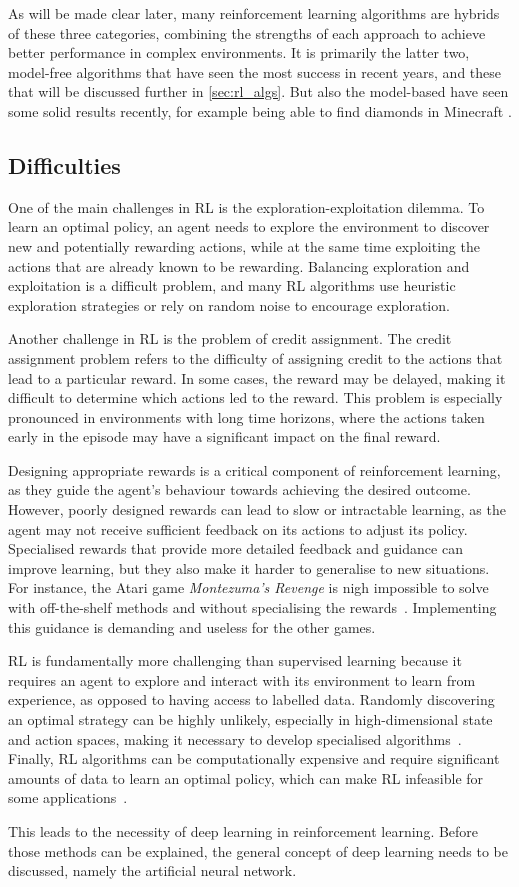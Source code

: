 As will be made clear later, many reinforcement learning algorithms are hybrids of these three categories, combining the strengths of each approach to achieve better performance in complex environments.
It is primarily the latter two, model-free algorithms that have seen the most success in recent years, and these that will be discussed further in \cref{sec:rl_algs}.
But also the model-based have seen some solid results recently, for example being able to find diamonds in Minecraft \cite{hafner2023}.


\subsection{Difficulties}
\label{sec:difficulties}
One of the main challenges in RL is the exploration-exploitation dilemma.
To learn an optimal policy, an agent needs to explore the environment to discover new and potentially rewarding actions, while at the same time exploiting the actions that are already known to be rewarding.
Balancing exploration and exploitation is a difficult problem, and many RL algorithms use heuristic exploration strategies or rely on random noise to encourage exploration.

Another challenge in RL is the problem of credit assignment.
The credit assignment problem refers to the difficulty of assigning credit to the actions that lead to a particular reward.
In some cases, the reward may be delayed, making it difficult to determine which actions led to the reward.
This problem is especially pronounced in environments with long time horizons, where the actions taken early in the episode may have a significant impact on the final reward.

Designing appropriate rewards is a critical component of reinforcement learning, as they guide the agent's behaviour towards achieving the desired outcome.
However, poorly designed rewards can lead to slow or intractable learning, as the agent may not receive sufficient feedback on its actions to adjust its policy.
Specialised rewards that provide more detailed feedback and guidance can improve learning, but they also make it harder to generalise to new situations.
For instance, the Atari game \textit{Montezuma's Revenge} is nigh impossible to solve with off-the-shelf methods and without specialising the rewards~\autocite{salimans2018}.
Implementing this guidance is demanding and useless for the other games.

RL is fundamentally more challenging than supervised learning because it requires an agent to explore and interact with its environment to learn from experience, as opposed to having access to labelled data.
Randomly discovering an optimal strategy can be highly unlikely, especially in high-dimensional state and action spaces, making it necessary to develop specialised algorithms~\autocite{sutton2018}.
Finally, RL algorithms can be computationally expensive and require significant amounts of data to learn an optimal policy, which can make RL infeasible for some applications~\autocite{silver2016}.

This leads to the necessity of deep learning in reinforcement learning.
Before those methods can be explained, the general concept of deep learning needs to be discussed, namely the artificial neural network.